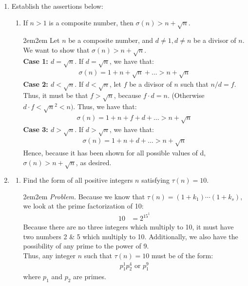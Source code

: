 \documentclass[10pt,oneside]{book}
\newcommand{\gspc}{\vspace{0.13cm}} %
\newcommand{\gline}{\gspc\\} %
\let\endoldproof\endproof
\renewenvironment{proof}[1][\proofname]
  {\vspace{0.2cm}\begin{adjustwidth}{2em}{2em}
   \oldproof[#1]}
  {\endoldproof
\end{adjustwidth}}
\newenvironment{problem}[1]
  {\vspace{-0.1cm}\begin{coloredadjust}\begin{adjustwidth}{2em}{2em}
   \textit{Problem. }#1}
  {\endoldproof
\end{adjustwidth}\end{coloredadjust}\gspc}
\begin{document}
\begin{enumerate}
\begin{enumerate}
	\end{enumerate}
	\item [11.] Establish the assertions below:
	\begin{enumerate}
		\item [(c)] If $n>1$ is a composite number, then $\sigma(n) > n+ \sqrt{n}$. 
		\begin{proof}
			Let $n$ be a composite number, and $d\ne 1, d\ne n$ be a divisor of $n$. We want to show that $\sigma(n)>n + \sqrt n$.\gline
			\textbf{Case 1: $d = \sqrt n$}. If $d = \sqrt n$, we have that:
			\begin{align*}
				\sigma(n) = 1 + n + \sqrt{n} + \ldots > n + \sqrt n
			\end{align*}
			\textbf{Case 2: $d < \sqrt n$}. If $d < \sqrt n$, let $f$ be a divisor of $n$ such that $n/d =f$. Thus, it must be that $f>\sqrt{n}$, because $f\cdot d = n$. (Otherwise $d\cdot f < \sqrt{n}^2 < n)$. Thus, we have that:
			\begin{align*}
				\sigma(n) = 1 + n + f + d + \ldots > n + \sqrt n
			\end{align*}
			\textbf{Case 3: $d > \sqrt n$}. If $d > \sqrt n$, we have that:
			\begin{align*}
				\sigma(n) = 1+ n + d + \ldots > n + \sqrt n
			\end{align*}
			Hence, because it has been shown for all possible values of d, $\sigma(n) > n + \sqrt n$, as desired. 
		\end{proof}
	\end{enumerate}
	\item [12.] \begin{enumerate}
		\item Find the form of all positive integers $n$ satisfying $\tau(n) = 10$.
		\begin{problem}
			Because we know that $\tau(n) = (1 + k_1)\cdots(1+k_s)$, we look at the prime factorization of 10:
			\begin{align*}
				10 &= 2^15^1
			\end{align*}
			Because there are no three integers which multiply to 10, it must have two numbers 2 \& 5 which multiply to 10. Additionally, we also have the possibility of any prime to the power of 9. \gline
			Thus, any integer $n$ such that $\tau(n) = 10$ must be of the form:
			\begin{align*}
				p_1^1p_2^4 \text{ or } p_1^9
			\end{align*}
			where $p_1$ and $p_2$ are primes. 
		\end{problem}

\end{enumerate}
\end{enumerate}
\end{document}
